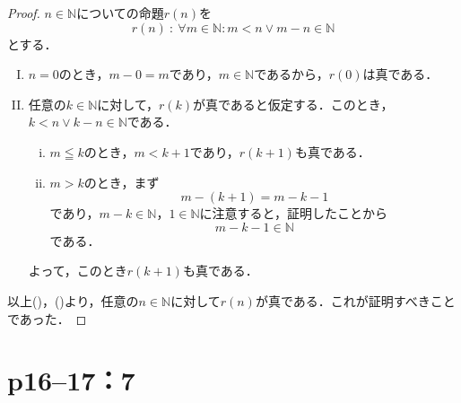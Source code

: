 \documentclass[a4paper,10pt,fleqn]{ltjsarticle}
\begin{document}
\newpage


\begin{tleftbar}
    \begin{proof}
        $n \in \mathbb{N}$についての命題$r(n)$を
        \[
            r(n) ~{:}~ \forall m \in \mathbb{N} \colon  m<n \lor m-n  \in \mathbb{N}
        \]
        とする．
        \begin{enumerate}[(I)]
            \item $n=0$のとき，$m - 0 =m$であり，$m \in \mathbb{N}$であるから，$r(0)$は真である．
            \item 任意の$k \in \mathbb{N}$に対して，$r(k)$が真であると仮定する．このとき，$k<n \lor k-n  \in \mathbb{N}$である．
                  \begin{enumerate}[(i)]
                      \item $m \leqq   k$のとき，$m <k+1$であり，$r(k+1)$も真である．
                      \item $m > k$のとき，まず
                            \[
                                m-(k+1)=m-k-1
                            \] であり，$m-k \in \mathbb{N}$，$1 \in \mathbb{N}$に注意すると，証明したことから
                            \[
                                m-k-1  \in \mathbb{N}
                            \]
                            である．
                  \end{enumerate}
                  よって，このとき$r(k+1)$も真である．
        \end{enumerate}
        以上()，()より，任意の$n \in \mathbb{N}$に対して$r(n)$が真である．これが証明すべきことであった．
    \end{proof}
\end{tleftbar}

\newpage

\section*{p16--17：7}
\end{document}

